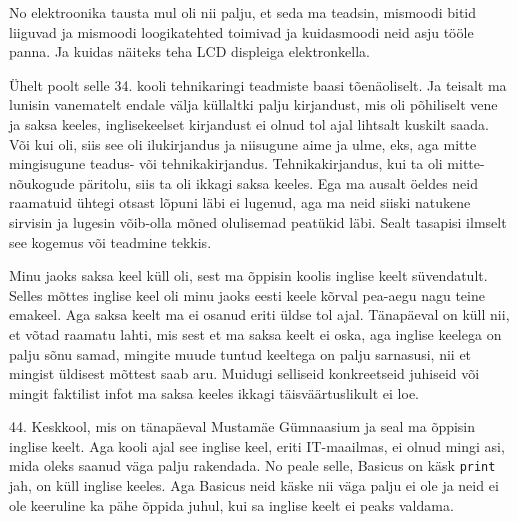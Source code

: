 No elektroonika tausta mul oli nii palju, et seda ma teadsin, mismoodi bitid 
liiguvad ja mismoodi  loogikatehted toimivad ja kuidasmoodi neid asju tööle panna. 
Ja kuidas näiteks teha LCD displeiga elektronkella.  


Ühelt poolt selle 34. kooli tehnikaringi teadmiste baasi tõenäoliselt. Ja teisalt ma lunisin vanematelt 
endale välja küllaltki palju kirjandust, mis oli põhiliselt vene ja saksa 
keeles, inglisekeelset kirjandust ei olnud tol ajal lihtsalt kuskilt saada. Või 
kui oli, siis see oli ilukirjandus ja niisugune aime ja ulme, eks, aga mitte 
mingisugune teadus- või tehnikakirjandus. Tehnikakirjandus, kui ta oli 
mitte-nõukogude päritolu, siis ta oli ikkagi saksa keeles. Ega ma ausalt öeldes 
neid raamatuid ühtegi otsast lõpuni läbi ei lugenud, aga ma neid siiski 
natukene sirvisin ja  lugesin võib-olla mõned olulisemad peatükid läbi. Sealt 
tasapisi ilmselt see kogemus või  teadmine tekkis.


Minu jaoks saksa keel küll oli, sest ma õppisin koolis inglise keelt 
süvendatult. Selles mõttes inglise keel oli  minu jaoks  eesti keele 
kõrval  pea-aegu nagu teine emakeel. Aga saksa keelt ma ei osanud eriti üldse tol 
ajal. Tänapäeval on küll nii, et võtad raamatu lahti, mis sest et ma saksa 
keelt ei oska, aga  inglise keelega on palju sõnu samad, mingite muude tuntud 
keeltega on palju sarnasusi, nii et mingist üldisest mõttest saab aru. Muidugi 
selliseid konkreetseid juhiseid või mingit faktilist infot ma saksa keeles 
ikkagi täisväärtuslikult ei loe. 


44. Keskkool, mis on tänapäeval Mustamäe 
Gümnaasium 
ja seal ma õppisin inglise keelt. Aga kooli ajal see inglise keel, eriti 
IT-maailmas, ei olnud mingi asi, mida oleks saanud väga palju rakendada. No 
peale selle, Basicus on käsk \verb|print| jah, on küll inglise keeles. Aga 
Basicus neid käske nii väga palju ei ole ja neid ei ole keeruline ka pähe 
õppida juhul, kui sa inglise keelt ei peaks valdama. 


